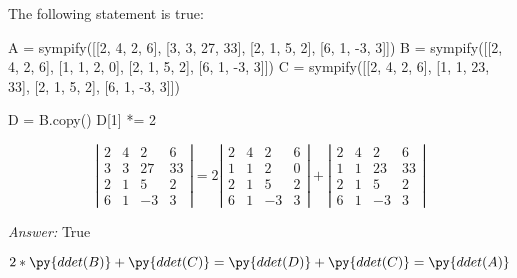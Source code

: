 \documentclass[letterpaper]{article}
\newcommand{\ans}{\textit{Answer: }}
\newenvironment{question}[2][Question]{\begin{trivlist}
\item[\hskip \labelsep {\bfseries #1}\hskip \labelsep {\bfseries #2.}]}{\end{trivlist}}
\begin{document}
\begin{question}{4.4}
  The following statement is true:

  \begin{pycode}
A = sympify([[2, 4, 2, 6], [3, 3, 27, 33], [2, 1, 5, 2], [6, 1, -3, 3]])    
B = sympify([[2, 4, 2, 6], [1, 1, 2, 0], [2, 1, 5, 2], [6, 1, -3, 3]])
C = sympify([[2, 4, 2, 6], [1, 1, 23, 33], [2, 1, 5, 2], [6, 1, -3, 3]])

D = B.copy()
D[1] *= 2
  \end{pycode}

  $$
  \left| \begin{array}{rrrr}{2} & {4} & {2} & {6} \\ {3} & {3} & {27} & {33} \\ {2} & {1} & {5} & {2} \\ {6} & {1} & {-3} & {3}\end{array}\right|=2 \left| \begin{array}{rrrr}{2} & {4} & {2} & {6} \\ {1} & {1} & {2} & {0} \\ {2} & {1} & {5} & {2} \\ {6} & {1} & {-3} & {3}\end{array}\right|+\left| \begin{array}{cccc}{2} & {4} & {2} & {6} \\ {1} & {1} & {23} & {33} \\ {2} & {1} & {5} & {2} \\ {6} & {1} & {-3} & {3}\end{array}\right|
  $$

  \ans True

  $$
  2 * \py{ddet(B)} + \py{ddet(C)} = \py{ddet(D)} + \py{ddet(C)} = \py{ddet(A)}
  $$
  
\end{question}
\end{document}
